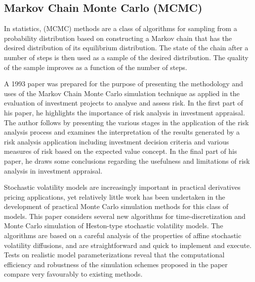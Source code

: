 \subsection{Markov Chain Monte Carlo (MCMC)}

In statistics, (MCMC) methods are a class of algorithms for sampling from a probability distribution based on constructing a Markov chain that has the desired distribution of its equilibrium distribution. The state of the chain after a number of steps is then used as a sample of the desired distribution. The quality of the sample improves as a function of the number of steps.

A 1993 paper was prepared for the purpose of presenting the methodology and uses of the Markov Chain Monte Carlo simulation technique as applied in the evaluation of investment projects to analyse and assess risk.\cite{Savvides:1994aa} In the first part of his paper, he highlights the importance of risk analysis in investment appraisal. The author follows by presenting the various stages in the application of the risk analysis process and examines the interpretation of the results generated by a risk analysis application including investment decision criteria and various measures of risk based on the expected value concept. In the final part of his paper, he draws some conclusions regarding the usefulness and limitations of risk analysis in investment appraisal.

Stochastic volatility models are increasingly important in practical derivatives pricing applications, yet relatively little work has been undertaken in the development of practical Monte Carlo simulation methods for this class of models. This paper considers several new algorithms for time-discretization and Monte Carlo simulation of Heston-type stochastic volatility models.\cite{Andersen:2007aa} The algorithms are based on a careful analysis of the properties of affine stochastic volatility diffusions, and are straightforward and quick to implement and execute. Tests on realistic model parameterizations reveal that the computational efficiency and robustness of the simulation schemes proposed in the paper compare very favourably to existing methods.

